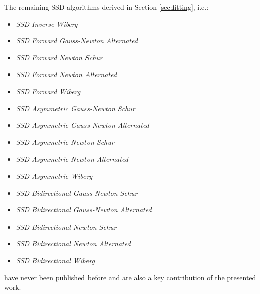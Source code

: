The remaining SSD algorithms derived in Section \ref{sec:fitting}, i.e.:
\begin{itemize}
\item \emph{SSD Inverse Wiberg}
\item \emph{SSD Forward Gauss-Newton Alternated}
\item \emph{SSD Forward Newton Schur}
\item \emph{SSD Forward Newton Alternated}
\item \emph{SSD Forward Wiberg}
\item \emph{SSD Asymmetric Gauss-Newton Schur}
\item \emph{SSD Asymmetric Gauss-Newton Alternated}
\item \emph{SSD Asymmetric Newton Schur}
\item \emph{SSD Asymmetric Newton Alternated}
\item \emph{SSD Asymmetric Wiberg}
\item \emph{SSD Bidirectional Gauss-Newton Schur}
\item \emph{SSD Bidirectional Gauss-Newton Alternated}
\item \emph{SSD Bidirectional Newton Schur}
\item \emph{SSD Bidirectional Newton Alternated}
\item \emph{SSD Bidirectional Wiberg}
\end{itemize}
have never been published before and are also a key contribution of the presented work.